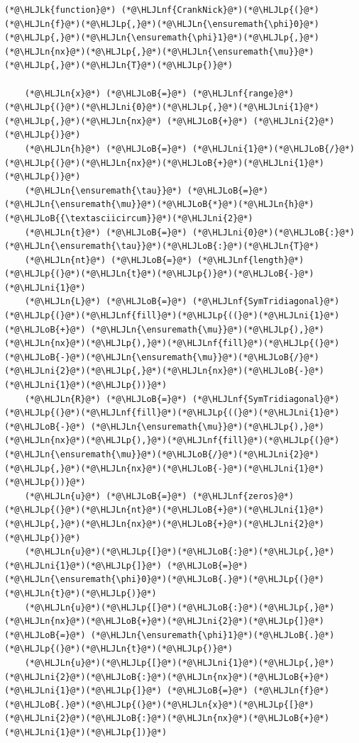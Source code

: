 \documentclass[12pt,a4paper]{article}
\newcommand{\HLJLk}[1]{\textcolor[RGB]{148,91,176}{\textbf{#1}}}
\newcommand{\HLJLn}[1]{#1}
\newcommand{\HLJLnf}[1]{\textcolor[RGB]{66,102,213}{#1}}
\newcommand{\HLJLni}[1]{\textcolor[RGB]{59,151,46}{#1}}
\newcommand{\HLJLoB}[1]{\textcolor[RGB]{102,102,102}{\textbf{#1}}}
\newcommand{\HLJLp}[1]{#1}
\begin{document}
\begin{lstlisting}
(*@\HLJLk{function}@*) (*@\HLJLnf{CrankNick}@*)(*@\HLJLp{(}@*)(*@\HLJLn{f}@*)(*@\HLJLp{,}@*)(*@\HLJLn{\ensuremath{\phi}0}@*)(*@\HLJLp{,}@*)(*@\HLJLn{\ensuremath{\phi}1}@*)(*@\HLJLp{,}@*)(*@\HLJLn{nx}@*)(*@\HLJLp{,}@*)(*@\HLJLn{\ensuremath{\mu}}@*)(*@\HLJLp{,}@*)(*@\HLJLn{T}@*)(*@\HLJLp{)}@*)
    
    (*@\HLJLn{x}@*) (*@\HLJLoB{=}@*) (*@\HLJLnf{range}@*)(*@\HLJLp{(}@*)(*@\HLJLni{0}@*)(*@\HLJLp{,}@*)(*@\HLJLni{1}@*)(*@\HLJLp{,}@*)(*@\HLJLn{nx}@*) (*@\HLJLoB{+}@*) (*@\HLJLni{2}@*)(*@\HLJLp{)}@*)
    (*@\HLJLn{h}@*) (*@\HLJLoB{=}@*) (*@\HLJLni{1}@*)(*@\HLJLoB{/}@*)(*@\HLJLp{(}@*)(*@\HLJLn{nx}@*)(*@\HLJLoB{+}@*)(*@\HLJLni{1}@*)(*@\HLJLp{)}@*)
    (*@\HLJLn{\ensuremath{\tau}}@*) (*@\HLJLoB{=}@*) (*@\HLJLn{\ensuremath{\mu}}@*)(*@\HLJLoB{*}@*)(*@\HLJLn{h}@*)(*@\HLJLoB{{\textasciicircum}}@*)(*@\HLJLni{2}@*)
    (*@\HLJLn{t}@*) (*@\HLJLoB{=}@*) (*@\HLJLni{0}@*)(*@\HLJLoB{:}@*)(*@\HLJLn{\ensuremath{\tau}}@*)(*@\HLJLoB{:}@*)(*@\HLJLn{T}@*)
    (*@\HLJLn{nt}@*) (*@\HLJLoB{=}@*) (*@\HLJLnf{length}@*)(*@\HLJLp{(}@*)(*@\HLJLn{t}@*)(*@\HLJLp{)}@*)(*@\HLJLoB{-}@*)(*@\HLJLni{1}@*)
    (*@\HLJLn{L}@*) (*@\HLJLoB{=}@*) (*@\HLJLnf{SymTridiagonal}@*)(*@\HLJLp{(}@*)(*@\HLJLnf{fill}@*)(*@\HLJLp{((}@*)(*@\HLJLni{1}@*) (*@\HLJLoB{+}@*) (*@\HLJLn{\ensuremath{\mu}}@*)(*@\HLJLp{),}@*)(*@\HLJLn{nx}@*)(*@\HLJLp{),}@*)(*@\HLJLnf{fill}@*)(*@\HLJLp{(}@*)(*@\HLJLoB{-}@*)(*@\HLJLn{\ensuremath{\mu}}@*)(*@\HLJLoB{/}@*)(*@\HLJLni{2}@*)(*@\HLJLp{,}@*)(*@\HLJLn{nx}@*)(*@\HLJLoB{-}@*)(*@\HLJLni{1}@*)(*@\HLJLp{))}@*)
    (*@\HLJLn{R}@*) (*@\HLJLoB{=}@*) (*@\HLJLnf{SymTridiagonal}@*)(*@\HLJLp{(}@*)(*@\HLJLnf{fill}@*)(*@\HLJLp{((}@*)(*@\HLJLni{1}@*) (*@\HLJLoB{-}@*) (*@\HLJLn{\ensuremath{\mu}}@*)(*@\HLJLp{),}@*)(*@\HLJLn{nx}@*)(*@\HLJLp{),}@*)(*@\HLJLnf{fill}@*)(*@\HLJLp{(}@*)(*@\HLJLn{\ensuremath{\mu}}@*)(*@\HLJLoB{/}@*)(*@\HLJLni{2}@*)(*@\HLJLp{,}@*)(*@\HLJLn{nx}@*)(*@\HLJLoB{-}@*)(*@\HLJLni{1}@*)(*@\HLJLp{))}@*)
    (*@\HLJLn{u}@*) (*@\HLJLoB{=}@*) (*@\HLJLnf{zeros}@*)(*@\HLJLp{(}@*)(*@\HLJLn{nt}@*)(*@\HLJLoB{+}@*)(*@\HLJLni{1}@*)(*@\HLJLp{,}@*)(*@\HLJLn{nx}@*)(*@\HLJLoB{+}@*)(*@\HLJLni{2}@*)(*@\HLJLp{)}@*)
    (*@\HLJLn{u}@*)(*@\HLJLp{[}@*)(*@\HLJLoB{:}@*)(*@\HLJLp{,}@*)(*@\HLJLni{1}@*)(*@\HLJLp{]}@*) (*@\HLJLoB{=}@*) (*@\HLJLn{\ensuremath{\phi}0}@*)(*@\HLJLoB{.}@*)(*@\HLJLp{(}@*)(*@\HLJLn{t}@*)(*@\HLJLp{)}@*)
    (*@\HLJLn{u}@*)(*@\HLJLp{[}@*)(*@\HLJLoB{:}@*)(*@\HLJLp{,}@*)(*@\HLJLn{nx}@*)(*@\HLJLoB{+}@*)(*@\HLJLni{2}@*)(*@\HLJLp{]}@*) (*@\HLJLoB{=}@*) (*@\HLJLn{\ensuremath{\phi}1}@*)(*@\HLJLoB{.}@*)(*@\HLJLp{(}@*)(*@\HLJLn{t}@*)(*@\HLJLp{)}@*)
    (*@\HLJLn{u}@*)(*@\HLJLp{[}@*)(*@\HLJLni{1}@*)(*@\HLJLp{,}@*)(*@\HLJLni{2}@*)(*@\HLJLoB{:}@*)(*@\HLJLn{nx}@*)(*@\HLJLoB{+}@*)(*@\HLJLni{1}@*)(*@\HLJLp{]}@*) (*@\HLJLoB{=}@*) (*@\HLJLn{f}@*)(*@\HLJLoB{.}@*)(*@\HLJLp{(}@*)(*@\HLJLn{x}@*)(*@\HLJLp{[}@*)(*@\HLJLni{2}@*)(*@\HLJLoB{:}@*)(*@\HLJLn{nx}@*)(*@\HLJLoB{+}@*)(*@\HLJLni{1}@*)(*@\HLJLp{])}@*)


\end{lstlisting}
\end{document}
